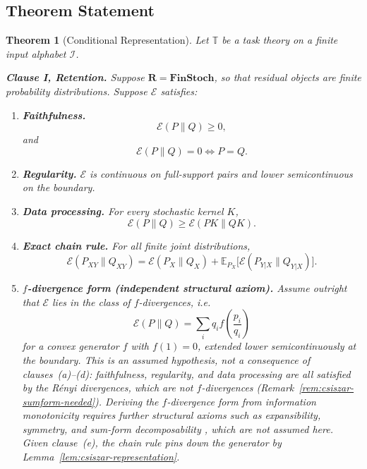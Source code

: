 \documentclass[12pt]{article}
\newtheorem{theorem}{Theorem}[section]
\theoremstyle{definition}
\begin{document}
\subsection{Theorem Statement}
\label{subsec:conditional-rep-statement}

\begin{theorem}[Conditional Representation]
\label{thm:master-rigorous}
Let $\mathbb T$ be a task theory on a finite input alphabet $\mathcal I$.

\medskip
\noindent\textbf{Clause I, Retention.}
Suppose $\mathbf R=\mathbf{FinStoch}$, so that residual objects are finite
probability distributions.  Suppose $\mathcal E$ satisfies:
\begin{enumerate}[label=(\alph*)]
\item \textbf{Faithfulness.}
\[
\mathcal E(P\|Q)\ge0,
\]
and
\[
\mathcal E(P\|Q)=0
\iff
P=Q.
\]

\item \textbf{Regularity.}
$\mathcal E$ is continuous on full-support pairs and lower semicontinuous on
the boundary.

\item \textbf{Data processing.}
For every stochastic kernel $K$,
\[
\mathcal E(P\|Q)
\ge
\mathcal E(PK\|QK).
\]

\item \textbf{Exact chain rule.}
For all finite joint distributions,
\[
\mathcal E(P_{XY}\|Q_{XY})
=
\mathcal E(P_X\|Q_X)
+
\mathbb E_{P_X}
\bigl[
\mathcal E(P_{Y|X}\|Q_{Y|X})
\bigr].
\]

\item \textbf{$f$-divergence form (independent structural axiom).}
Assume outright that $\mathcal E$ lies in the class of $f$-divergences, i.e.
\[
\mathcal E(P\|Q)
=
\sum_i q_i f\!\left(\frac{p_i}{q_i}\right)
\]
for a convex generator $f$ with $f(1)=0$, extended lower semicontinuously at
the boundary.  This is an \emph{assumed} hypothesis, not a consequence of
clauses~(a)--(d): faithfulness, regularity, and data processing are all
satisfied by the R\'enyi divergences, which are not $f$-divergences
(Remark~\ref{rem:csiszar-sumform-needed}).  Deriving the $f$-divergence form
from information monotonicity requires further structural axioms such as
expansibility, symmetry, and sum-form decomposability
\cite{csiszar1978,amari2009}, which are not assumed here.  Given clause~(e), the chain rule pins down the generator by
Lemma~\ref{lem:csiszar-representation}.


\end{enumerate}
\end{theorem}
\end{document}
